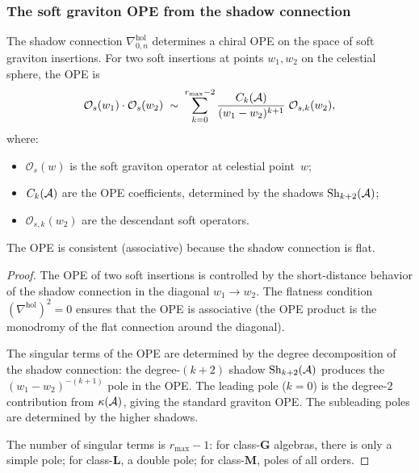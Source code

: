 \subsubsection{The soft graviton OPE from the shadow connection}

\begin{theorem}
\label{thm:thqg-VI-soft-ope}
The shadow connection $\nabla^{\mathrm{hol}}_{0,n}$ determines a
chiral OPE on the space of soft graviton insertions. For two soft
insertions at points $w_1, w_2$ on the celestial sphere, the OPE is
\begin{equation}\label{eq:thqg-VI-soft-ope}
\mathcal{O}_s(w_1) \cdot \mathcal{O}_s(w_2)
\;\sim\;
\sum_{k=0}^{r_{\max}-2}
\frac{C_k(\mathcal{A})}{(w_1 - w_2)^{k+1}}\;\mathcal{O}_{s,k}(w_2),
\end{equation}
where:
\begin{itemize}
\item $\mathcal{O}_s(w)$ is the soft graviton operator at
 celestial point~$w$;
\item $C_k(\mathcal{A})$ are the OPE coefficients, determined by the
 shadows $\operatorname{Sh}_{k+2}(\mathcal{A})$;
\item $\mathcal{O}_{s,k}(w_2)$ are the descendant soft operators.
\end{itemize}
The OPE is consistent (associative) because the shadow connection
is flat.
\end{theorem}

\begin{proof}
The OPE of two soft insertions is controlled by the short-distance
behavior of the shadow connection in the diagonal
$w_1 \to w_2$. The flatness condition
$(\nabla^{\mathrm{hol}})^2 = 0$ ensures that the OPE is
associative (the OPE product is the monodromy of the flat
connection around the diagonal).

The singular terms of the OPE are determined by the degree
decomposition of the shadow connection:
the degree-$(k+2)$ shadow $\operatorname{Sh}_{k+2}(\mathcal{A})$ produces the
$(w_1 - w_2)^{-(k+1)}$ pole in the OPE. The leading pole
($k=0$) is the degree-$2$ contribution from $\kappa(\mathcal{A})$,
giving the standard graviton OPE. The subleading poles are
determined by the higher shadows.

The number of singular terms is $r_{\max} - 1$: for
class-$\mathbf{G}$ algebras, there is only a simple pole; for
class-$\mathbf{L}$, a double pole; for class-$\mathbf{M}$,
poles of all orders.
\end{proof}

